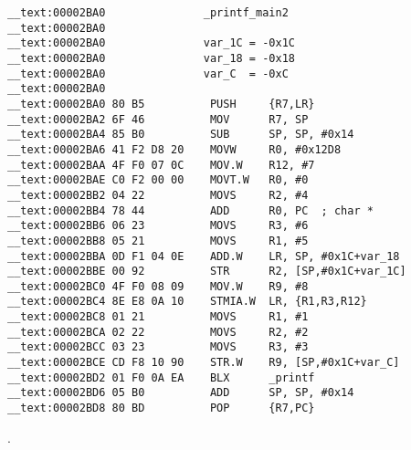 \begin{lstlisting}
__text:00002BA0               _printf_main2
__text:00002BA0
__text:00002BA0               var_1C = -0x1C
__text:00002BA0               var_18 = -0x18
__text:00002BA0               var_C  = -0xC
__text:00002BA0
__text:00002BA0 80 B5          PUSH     {R7,LR}
__text:00002BA2 6F 46          MOV      R7, SP
__text:00002BA4 85 B0          SUB      SP, SP, #0x14
__text:00002BA6 41 F2 D8 20    MOVW     R0, #0x12D8
__text:00002BAA 4F F0 07 0C    MOV.W    R12, #7
__text:00002BAE C0 F2 00 00    MOVT.W   R0, #0
__text:00002BB2 04 22          MOVS     R2, #4
__text:00002BB4 78 44          ADD      R0, PC  ; char *
__text:00002BB6 06 23          MOVS     R3, #6
__text:00002BB8 05 21          MOVS     R1, #5
__text:00002BBA 0D F1 04 0E    ADD.W    LR, SP, #0x1C+var_18
__text:00002BBE 00 92          STR      R2, [SP,#0x1C+var_1C]
__text:00002BC0 4F F0 08 09    MOV.W    R9, #8
__text:00002BC4 8E E8 0A 10    STMIA.W  LR, {R1,R3,R12}
__text:00002BC8 01 21          MOVS     R1, #1
__text:00002BCA 02 22          MOVS     R2, #2
__text:00002BCC 03 23          MOVS     R3, #3
__text:00002BCE CD F8 10 90    STR.W    R9, [SP,#0x1C+var_C]
__text:00002BD2 01 F0 0A EA    BLX      _printf
__text:00002BD6 05 B0          ADD      SP, SP, #0x14
__text:00002BD8 80 BD          POP      {R7,PC}
\end{lstlisting}

.


